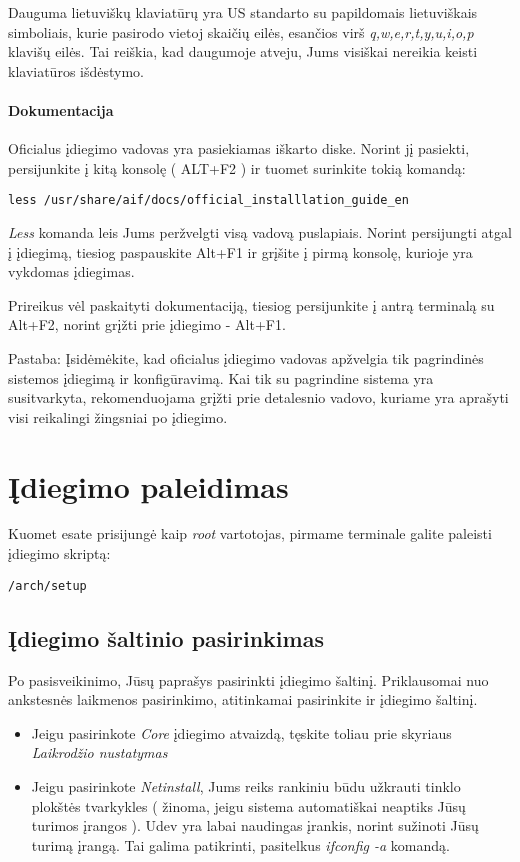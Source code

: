   Dauguma lietuviškų klaviatūrų yra US standarto su papildomais
  lietuviškais simboliais, kurie pasirodo vietoj skaičių eilės,
  esančios virš \textsl{q,w,e,r,t,y,u,i,o,p} klavišų eilės. Tai
  reiškia, kad daugumoje atveju, Jums visiškai nereikia keisti
  klaviatūros išdėstymo.

  \paragraph{Dokumentacija}

  Oficialus įdiegimo vadovas yra pasiekiamas iškarto diske. Norint jį
  pasiekti, persijunkite į kitą konsolę ( ALT+F2 ) ir tuomet surinkite
  tokią komandą:
  \begin{verbatim}
less /usr/share/aif/docs/official_installlation_guide_en
  \end{verbatim}

  \textsl{Less} komanda leis Jums peržvelgti visą vadovą
  puslapiais. Norint persijungti atgal į įdiegimą, tiesiog paspauskite
  Alt+F1 ir grįšite į pirmą konsolę, kurioje yra vykdomas įdiegimas.

  Prireikus vėl paskaityti dokumentaciją, tiesiog persijunkite į antrą
  terminalą su Alt+F2, norint grįžti prie įdiegimo - Alt+F1.

  Pastaba: Įsidėmėkite, kad oficialus įdiegimo vadovas apžvelgia tik
  pagrindinės sistemos įdiegimą ir konfigūravimą. Kai tik su
  pagrindine sistema yra susitvarkyta, rekomenduojama grįžti prie
  detalesnio vadovo, kuriame yra aprašyti visi reikalingi žingsniai po
  įdiegimo.

  \section{Įdiegimo paleidimas}

  Kuomet esate prisijungė kaip \textsl{root} vartotojas, pirmame
  terminale galite paleisti įdiegimo skriptą:
  \begin{verbatim}
/arch/setup
  \end{verbatim}

  \subsection{Įdiegimo šaltinio pasirinkimas}

  Po pasisveikinimo, Jūsų paprašys pasirinkti įdiegimo
  šaltinį. Priklausomai nuo ankstesnės laikmenos pasirinkimo,
  atitinkamai pasirinkite ir įdiegimo šaltinį.
  \begin{itemize}
    \item Jeigu pasirinkote \textsl{Core} įdiegimo atvaizdą, tęskite
      toliau prie skyriaus \textsl{Laikrodžio nustatymas}
    \item Jeigu pasirinkote \textsl{Netinstall}, Jums reiks rankiniu
      būdu užkrauti tinklo plokštės tvarkykles ( žinoma, jeigu sistema
      automatiškai neaptiks Jūsų turimos įrangos ). Udev yra labai
      naudingas įrankis, norint sužinoti Jūsų turimą įrangą. Tai
      galima patikrinti, pasitelkus \textsl{ifconfig -a} komandą.
  \end{itemize}

